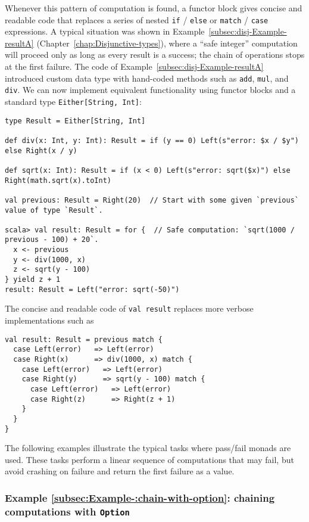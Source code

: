Whenever this pattern of computation is found, a functor block gives
concise and readable code that replaces a series of nested \lstinline!if!
/ \lstinline!else! or \lstinline!match! / \lstinline!case! expressions.
A typical situation was shown in Example~\ref{subsec:disj-Example-resultA}
(Chapter~\ref{chap:Disjunctive-types}), where a \textsf{``}safe integer\textsf{''}
computation will proceed only as long as every result is a success;
the chain of operations stops at the first failure. The code of Example~\ref{subsec:disj-Example-resultA}
introduced custom data type with hand-coded methods such as \lstinline!add!,
\lstinline!mul!, and \lstinline!div!. We can now implement equivalent
functionality using functor blocks and a standard type \lstinline!Either[String, Int]!:
\begin{lstlisting}
type Result = Either[String, Int]

def div(x: Int, y: Int): Result = if (y == 0) Left(s"error: $x / $y") else Right(x / y)

def sqrt(x: Int): Result = if (x < 0) Left(s"error: sqrt($x)") else Right(math.sqrt(x).toInt)

val previous: Result = Right(20)  // Start with some given `previous` value of type `Result`.

scala> val result: Result = for {  // Safe computation: `sqrt(1000 / previous - 100) + 20`.
  x <- previous
  y <- div(1000, x)
  z <- sqrt(y - 100)
} yield z + 1
result: Result = Left("error: sqrt(-50)")
\end{lstlisting}
The concise and readable code of \lstinline!val result! replaces
more verbose implementations such as
\begin{lstlisting}
val result: Result = previous match {
  case Left(error)   => Left(error)
  case Right(x)      => div(1000, x) match {
    case Left(error)   => Left(error)
    case Right(y)      => sqrt(y - 100) match {
      case Left(error)   => Left(error)
      case Right(z)      => Right(z + 1)
    }
  }
}
\end{lstlisting}

The following examples illustrate the typical tasks where pass/fail
monads are used. These tasks perform a linear sequence of computations
that may fail, but avoid crashing on failure and return the first
failure as a value.

\subsubsection{Example \label{subsec:Example-:chain-with-option}\ref{subsec:Example-:chain-with-option}:
chaining computations with \texttt{Option}}

